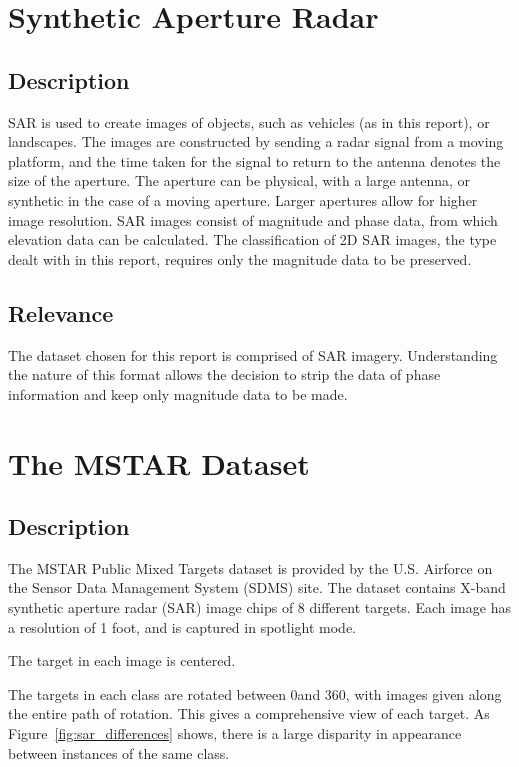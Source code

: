\section{Synthetic Aperture Radar}
\subsection{Description}
SAR is used to create images of objects, such as vehicles (as in this report), or landscapes. The images are constructed by sending a radar signal from a moving platform, and the time taken for the signal to return to the antenna denotes the size of the aperture. The aperture can be physical, with a large antenna, or synthetic in the case of a moving aperture. Larger apertures allow for higher image resolution. SAR images consist of magnitude and phase data, from which elevation data can be calculated. \cite{curlander1991synthetic} The classification of 2D SAR images, the type dealt with in this report, requires only the magnitude data to be preserved.
\subsection{Relevance}
The dataset chosen for this report is comprised of SAR imagery. Understanding the nature of this format allows the decision to strip the data of phase information and keep only magnitude data to be made. 

\section{The MSTAR Dataset}\label{lit:MSTAR}
\subsection{Description}
The MSTAR Public Mixed Targets dataset is provided by the U.S. Airforce on the Sensor Data Management System (SDMS) site\cite{MSTAR}. The dataset contains X-band synthetic aperture radar (SAR) image chips of 8 different targets. Each image has a resolution of 1 foot, and is captured in spotlight mode. 

The target in each image is centered.

The targets in each class are rotated between 0\degree and 360\degree, with images given along the entire path of rotation. This gives a comprehensive view of each target. As Figure~\ref{fig:sar_differences} shows, there is a large disparity in appearance between instances of the same class.

